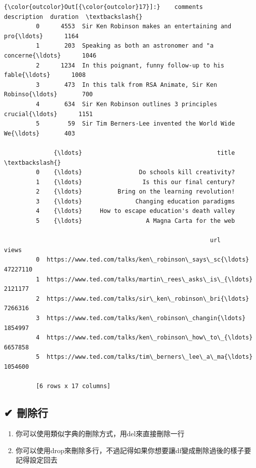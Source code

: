 \documentclass[11pt]{ctexart}
\providecommand{\tightlist}{%
      \setlength{\itemsep}{0pt}\setlength{\parskip}{0pt}}
\begin{document}
\begin{Verbatim}[commandchars=\\\{\}]
{\color{outcolor}Out[{\color{outcolor}17}]:}    comments                                        description  duration  \textbackslash{}
         0      4553  Sir Ken Robinson makes an entertaining and pro{\ldots}      1164   
         1       203  Speaking as both an astronomer and "a concerne{\ldots}      1046   
         2      1234  In this poignant, funny follow-up to his fable{\ldots}      1008   
         3       473  In this talk from RSA Animate, Sir Ken Robinso{\ldots}       700   
         4       634  Sir Ken Robinson outlines 3 principles crucial{\ldots}      1151   
         5        59  Sir Tim Berners-Lee invented the World Wide We{\ldots}       403   
         
              {\ldots}                                      title  \textbackslash{}
         0    {\ldots}                Do schools kill creativity?   
         1    {\ldots}                 Is this our final century?   
         2    {\ldots}          Bring on the learning revolution!   
         3    {\ldots}               Changing education paradigms   
         4    {\ldots}     How to escape education's death valley   
         5    {\ldots}                  A Magna Carta for the web   
         
                                                          url     views  
         0  https://www.ted.com/talks/ken\_robinson\_says\_sc{\ldots}  47227110  
         1  https://www.ted.com/talks/martin\_rees\_asks\_is\_{\ldots}   2121177  
         2  https://www.ted.com/talks/sir\_ken\_robinson\_bri{\ldots}   7266316  
         3  https://www.ted.com/talks/ken\_robinson\_changin{\ldots}   1854997  
         4  https://www.ted.com/talks/ken\_robinson\_how\_to\_{\ldots}   6657858  
         5  https://www.ted.com/talks/tim\_berners\_lee\_a\_ma{\ldots}   1054600  
         
         [6 rows x 17 columns]
\end{Verbatim}
            
    \hypertarget{ux522aux9664ux884c}{%
\subsection{✔ 刪除行}\label{ux522aux9664ux884c}}

\begin{enumerate}
\def\labelenumi{\arabic{enumi}.}
\tightlist
\item
  你可以使用類似字典的刪除方式，用del來直接刪除一行
\item
  你可以使用drop來刪除多行，不過記得如果你想要讓df變成刪除過後的樣子要記得設定回去
\end{enumerate}
\end{document}
